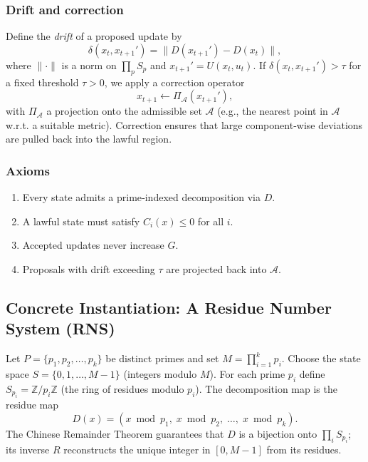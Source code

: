 \documentclass[12pt]{article}
\begin{document}
\subsubsection{Drift and correction}
Define the \emph{drift} of a proposed update by
\[
\delta(x_t,x_{t+1}') = \bigl\| D(x_{t+1}') - D(x_t) \bigr\|,
\]
where \(\|\cdot\|\) is a norm on \(\prod_p S_p\) and \(x_{t+1}' = U(x_t,u_t)\).  
If \(\delta(x_t,x_{t+1}') > \tau\) for a fixed threshold \(\tau>0\), we apply a correction operator
\[
x_{t+1} \leftarrow \Pi_{\mathcal{A}}(x_{t+1}'),
\]
with \(\Pi_{\mathcal{A}}\) a projection onto the admissible set \(\mathcal{A}\) (e.g., the nearest point in \(\mathcal{A}\) w.r.t. a suitable metric).  
Correction ensures that large component‑wise deviations are pulled back into the lawful region.

\subsubsection{Axioms}
\begin{enumerate}
\item[(A1) \textsc{Decomposition axiom}] Every state admits a prime‑indexed decomposition via \(D\).
\item[(A2) \textsc{Constraint axiom}] A lawful state must satisfy \(C_i(x)\le 0\) for all \(i\).
\item[(A3) \textsc{Monotone governance axiom}] Accepted updates never increase \(G\).
\item[(A4) \textsc{Correction axiom}] Proposals with drift exceeding \(\tau\) are projected back into \(\mathcal{A}\).
\end{enumerate}

\subsection{Concrete Instantiation: A Residue Number System (RNS)}

Let \(P = \{p_1,p_2,\dots,p_k\}\) be distinct primes and set \(M = \prod_{i=1}^k p_i\).  
Choose the state space \(S = \{0,1,\dots,M-1\}\) (integers modulo \(M\)).  
For each prime \(p_i\) define \(S_{p_i} = \mathbb{Z}/p_i\mathbb{Z}\) (the ring of residues modulo \(p_i\)).  
The decomposition map is the residue map
\[
D(x) = (x \bmod p_1,\; x \bmod p_2,\; \dots,\; x \bmod p_k).
\]
The Chinese Remainder Theorem guarantees that \(D\) is a bijection onto \(\prod_i S_{p_i}\); its inverse \(R\) reconstructs the unique integer in \([0,M-1]\) from its residues.
\end{document}
